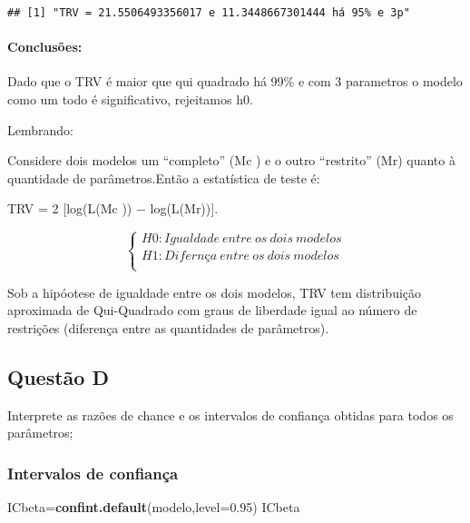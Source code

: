 \documentclass[
]{article}
\newenvironment{Shaded}{\begin{snugshade}}{\end{snugshade}}
\newcommand{\AttributeTok}[1]{\textcolor[rgb]{0.13,0.29,0.53}{#1}}
\newcommand{\FloatTok}[1]{\textcolor[rgb]{0.00,0.00,0.81}{#1}}
\newcommand{\FunctionTok}[1]{\textcolor[rgb]{0.13,0.29,0.53}{\textbf{#1}}}
\newcommand{\NormalTok}[1]{#1}
\newcommand{\OtherTok}[1]{\textcolor[rgb]{0.56,0.35,0.01}{#1}}
\begin{document}
\begin{verbatim}
## [1] "TRV = 21.5506493356017 e 11.3448667301444 há 95% e 3p"
\end{verbatim}

\hypertarget{conclusuxf5es-13}{%
\paragraph{Conclusões:}\label{conclusuxf5es-13}}

Dado que o TRV é maior que qui quadrado há 99\% e com 3 parametros o
modelo como um todo é significativo, rejeitamos h0.

Lembrando:

Considere dois modelos um ``completo'' (Mc ) e o outro ``restrito'' (Mr)
quanto à quantidade de parâmetros.Então a estatística de teste é:

TRV = 2 {[}log(L(Mc )) − log(L(Mr)){]}.

\[
\left\{ \begin{array}{rc} 
H0: Igualdade \ entre \ os \ dois \ modelos \\ 
H1: Difernça \ entre \ os \ dois \ modelos \\ 
\end{array}\right.
\]

Sob a hipóotese de igualdade entre os dois modelos, TRV tem distribuição
aproximada de Qui-Quadrado com graus de liberdade igual ao número de
restrições (diferença entre as quantidades de parâmetros).

\hypertarget{questuxe3o-d-1}{%
\subsection{Questão D}\label{questuxe3o-d-1}}

Interprete as razões de chance e os intervalos de confiança obtidas para
todos os parâmetros;

\hypertarget{intervalos-de-confianuxe7a}{%
\subsubsection{Intervalos de
confiança}\label{intervalos-de-confianuxe7a}}

\begin{Shaded}
\begin{Highlighting}[]
\NormalTok{ICbeta}\OtherTok{=}\FunctionTok{confint.default}\NormalTok{(modelo,}\AttributeTok{level=}\FloatTok{0.95}\NormalTok{)}
\NormalTok{ICbeta}
\end{Highlighting}
\end{Shaded}
\end{document}
